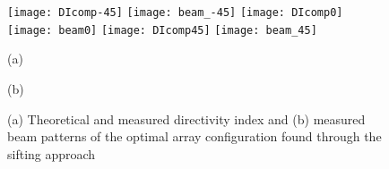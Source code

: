 \documentclass[9pt]{article}
\begin{document}
\begin{figure}[t!]
\texttt{[image: DIcomp-45]} \hspace{-0.4cm} \vspace{0.1cm}
\texttt{[image: beam\_-45]}
\texttt{[image: DIcomp0]} \hspace{-0.4cm} \vspace{0.1cm}
\texttt{[image: beam0]}
\texttt{[image: DIcomp45]} \hspace{-0.4cm} \vspace{0.1cm}
\texttt{[image: beam\_45]} \vspace{0.1cm}
\begin{minipage}[h]{0.25\textwidth}
\begin{center}
\small (a)
\end{center}
\end{minipage} \vspace{-0.4cm}
\begin{minipage}[h]{0.25\textwidth}
\begin{center}
\small (b)
\end{center}
\end{minipage} \vspace{-0.4cm} 
 \caption{(a) Theoretical and measured directivity index and (b) measured beam patterns of the optimal array configuration found through the sifting approach}\vspace{-0.2 cm}
\label{fig: dipatterns}
\end{figure}
\end{document}
